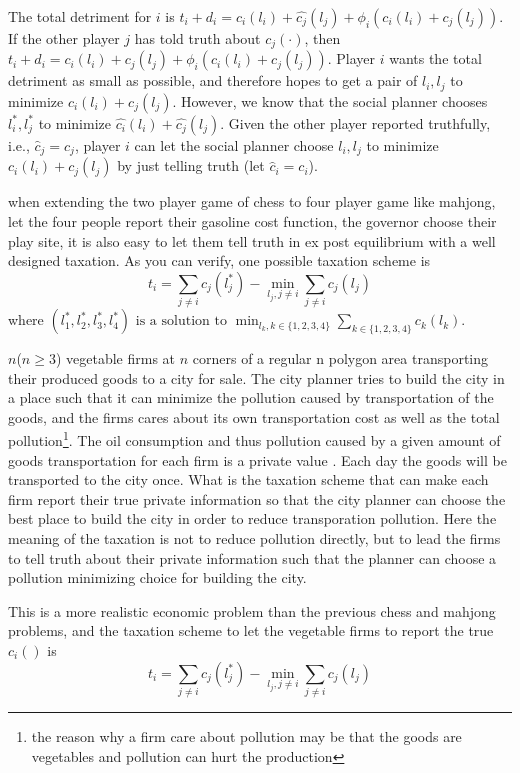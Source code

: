  The total detriment for $i$ is $ t_i+ d_i = c_i(l_i)+\hat{c_j}(l_j)+\phi_i(c_i(l_i)+c_j(l_j))$. If the other player $j$ has told truth about $c_j(\cdot)$, then $ t_i+ d_i = c_i(l_i)+c_j(l_j)+\phi_i(c_i(l_i)+c_j(l_j))$.  Player $i$ wants the total detriment as small as possible, and therefore hopes to get a pair of $l_i,l_j$ to minimize $c_i(l_i)+c_j(l_j)$. However, we know that the social planner chooses $l_i^*,l_j^*$ to minimize $\hat{c_i}(l_i)+\hat{c_j}(l_j)$. Given the other player reported truthfully, i.e.,  $\hat{c}_j=c_j$, player $i$ can let the social planner choose $l_i,l_j$ to minimize $c_i(l_i)+c_j(l_j)$ by just telling truth (let $\hat{c}_i=c_i$).

when extending the two player game of chess to four player game like mahjong, let the four people report their gasoline cost function, the governor choose their play site,
it is also easy to let them tell truth in ex post equilibrium with a well designed taxation. As you can verify, one possible taxation scheme is
$$t_i= \sum_{j\not=i}c_j(l_j^*)- \min_{l_j,j\not =i}\sum_{j\not=i}c_j(l_j)$$
where $(l_1^*,l_2^*,l_3^*,l_4^*) \text{ is a solution to } \min_{l_k,k\in \{1,2,3,4\}}\sum_{k\in \{1,2,3,4\}}c_k(l_k)$.

\begin{example}
 $n$($n \geq 3$) vegetable firms at $n$ corners of a regular n polygon area transporting their produced goods to a city for sale.
The city planner tries to build the city in a place such that it can minimize the pollution caused by transportation of the goods, 
and the firms cares about its own transportation cost as well as the total pollution\footnote{the reason why a firm care about pollution
may be that the goods are vegetables and pollution can hurt the production}. The oil consumption and thus pollution caused 
by a given amount of goods transportation for each firm is a private value . Each day the goods will be transported to the city once.
What is the taxation scheme that can make each firm report their true private information so that the city 
planner can choose the best place to build the city in order to reduce transporation pollution. Here the meaning of the taxation is not
to reduce pollution directly, but to lead the firms to tell truth about their private information such that the planner can choose a
pollution minimizing choice for building the city.
\end{example}

This is a more realistic economic problem than the previous chess and mahjong problems, and the taxation scheme to let the vegetable firms to report
the true $c_i()$ is
$$ t_i = \sum_{j\not=i}c_j(l_j^*)- \min_{l_j,j\not =i}\sum_{j\not=i}c_j(l_j) $$

